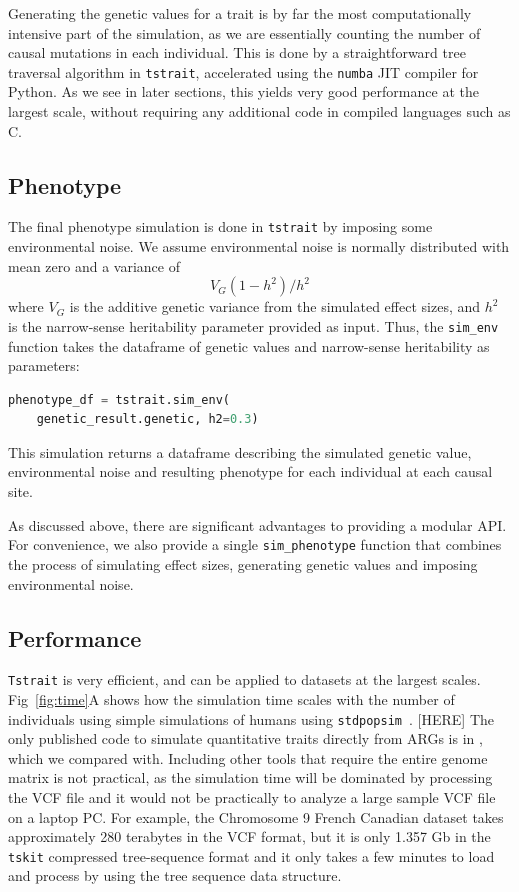 \documentclass[unnumsec,webpdf,modern,large,namedate]{oup-authoring-template}%
\begin{document}
Generating the genetic values for a trait is by far the
most computationally intensive part of the simulation,
as we are essentially counting the number
of causal mutations in each individual. This is done by a
straightforward tree traversal algorithm in \texttt{tstrait},
accelerated using the \texttt{numba} JIT compiler for Python.
As we see in later sections, this yields very good performance
at the largest scale, without requiring any additional code in
compiled languages such as C.

\subsection{Phenotype}
The final phenotype simulation is done in \texttt{tstrait}
by imposing some environmental noise.
We assume environmental noise is normally distributed with mean zero
and a variance of
\[
V_G(1-h^2)/{h^2}
\]
where $V_G$ is the additive genetic variance from the simulated effect sizes,
and $h^2$ is the narrow-sense heritability parameter provided as input.
Thus, the \texttt{sim\_env} function takes the dataframe of genetic values
and narrow-sense heritability as parameters:
\begin{lstlisting}[language=Python]
phenotype_df = tstrait.sim_env(
    genetic_result.genetic, h2=0.3)
\end{lstlisting}
This simulation returns a dataframe
describing the simulated genetic value, environmental noise and
resulting phenotype for each individual at each causal site.

As discussed above, there are significant advantages to providing a modular
API. For convenience, we also provide a single
\texttt{sim\_phenotype} function that combines the process of simulating
effect sizes, generating genetic values and imposing environmental noise.

\subsection{Performance}
\texttt{Tstrait} is very efficient, and can be applied to datasets at the
largest scales.
Fig~\ref{fig:time}A shows how the simulation time scales
with the number of individuals using simple simulations
of humans using \texttt{stdpopsim}~\citep{adrion2020}.
[HERE]
The only published code to simulate quantitative traits
directly from ARGs is in \cite{martin2017}, which we compared with. Including
other tools that require the entire genome matrix is not practical, as the
simulation time will be dominated by processing the VCF file and it would not
be practically to analyze a large sample VCF file on a laptop PC. For example,
the Chromosome 9 French Canadian dataset takes approximately 280 terabytes in
the VCF format, but it is only 1.357 Gb in the \texttt{tskit} compressed
tree-sequence format and it only takes a few minutes to load and process by
using the tree sequence data structure.
\end{document}
